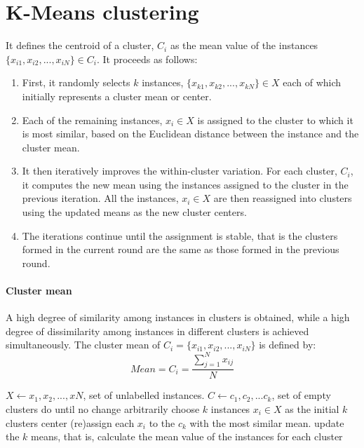 \section{K-Means clustering}
It defines the centroid of a cluster, $C_i$ as the mean value of the instances $\{ x_{i1}, x_{i2}, ..., x_{iN} \} \in C_i$. It proceeds as follows:
\begin{enumerate}
    \item First, it randomly selects $k$ instances, $\{x_{k1}, x_{k2}, ..., x_{kN} \} \in X$ each of which initially represents a
cluster mean or center. 
    \item Each of the remaining instances, $x_i \in X$ is assigned to the cluster to which it is most similar, based on the Euclidean distance between the instance and the cluster mean. 
    \item It then iteratively improves the within-cluster variation. For each cluster, $C_i$, it computes the new mean using the instances assigned to the cluster in the previous iteration. All the instances, $x_i \in X$ are then reassigned into clusters using the updated means as the new cluster centers. \item The iterations continue until the assignment is stable, that is the clusters formed in the current round are the same as those formed in the previous round.
\end{enumerate}

\paragraph{Cluster mean} A high degree of similarity among instances in clusters is obtained, while a high degree of dissimilarity among instances in different clusters is achieved simultaneously. The cluster mean of $C_i = \{x_{i1}, x_{i2}, ..., x_{iN} \}$ is
defined by:
\begin{equation*}
    Mean = C_i = \frac{\sum^N_{j=1} x_{ij}}{N}
\end{equation*}

\begin{algorithm}[caption={k-Means clustering},label={alg12}]
$X \leftarrow {x_1, x_2, ... , xN }$, set of unlabelled instances.
$C \leftarrow {c_1, c_2, ... c_k}$, set of empty clusters
do until no change
    arbitrarily choose $k$ instances $x_i \in X$ as the initial $k$ clusters center
    (re)assign each $x_i$ to the $c_k$ with the most similar mean.
    update the $k$ means, that is, calculate the mean value of the instances for each cluster
\end{algorithm}

